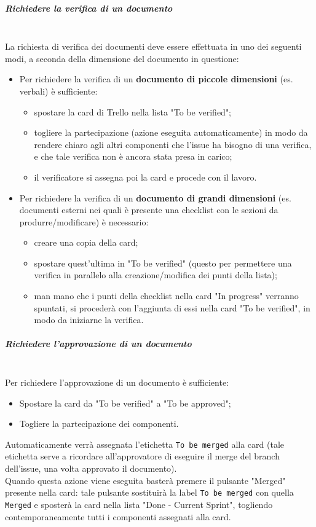 \subparagraph{Richiedere la verifica di un documento}
\mbox{}\\
La richiesta di verifica dei documenti deve essere effettuata in uno dei seguenti modi, 
a seconda della dimensione del documento in questione:
\begin{itemize}
    \item Per richiedere la verifica di un \textbf{documento di piccole dimensioni} (es. verbali) è sufficiente:
    \begin{itemize}
        \item spostare la card di Trello nella lista "To be verified"; 
        \item togliere la partecipazione (azione eseguita automaticamente) in modo da rendere chiaro agli altri 
        componenti che l'issue ha bisogno di una verifica, e che tale verifica non è ancora stata presa in carico;
        \item il verificatore si assegna poi la card e procede con il lavoro.
    \end{itemize}
    \item Per richiedere la verifica di un \textbf{documento di grandi dimensioni} (es. documenti esterni nei quali è presente 
    una checklist con le sezioni da produrre/modificare) è necessario:
    \begin{itemize}
        \item creare una copia della card;
        \item spostare quest'ultima in "To be verified" (questo per permettere una verifica in parallelo alla 
        creazione/modifica dei punti della lista);
        \item man mano che i punti della checklist nella card "In progress" verranno spuntati, si procederà con 
        l'aggiunta di essi nella card "To be verified", in modo da iniziarne la verifica.
    \end{itemize}
\end{itemize}

\subparagraph{Richiedere l'approvazione di un documento}
\mbox{}\\
Per richiedere l'approvazione di un documento è sufficiente:
\begin{itemize}
    \item Spostare la card da "To be verified" a "To be approved";
    \item Togliere la partecipazione dei componenti.
\end{itemize}  
Automaticamente verrà assegnata l'etichetta \texttt{To be merged} alla card (tale etichetta serve a ricordare all'approvatore 
di eseguire il merge del branch dell'issue, una volta approvato il documento).\\
Quando questa azione viene eseguita basterà premere il pulsante "Merged" presente nella card: tale pulsante sostituirà la label 
\texttt{To be merged} con quella \texttt{Merged} e sposterà la card nella lista "Done - Current Sprint", togliendo contemporaneamente tutti i 
componenti assegnati alla card.

